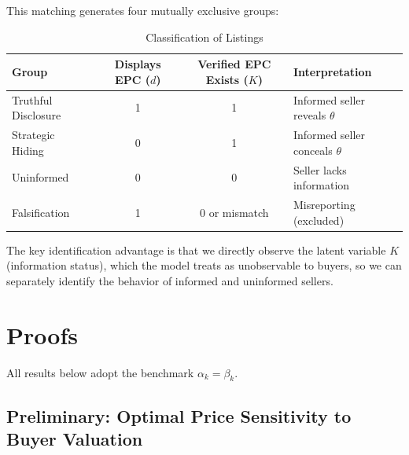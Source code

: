 \documentclass[10pt,letterpaper]{bp-template-concise}
\begin{document}
This matching generates four mutually exclusive groups:

\begin{table}[htbp]
\centering
\caption{Classification of Listings}
\label{tab:listing_types}
\renewcommand{\arraystretch}{1.4}
\begin{tabular}{lccl}
\toprule
\toprule
\textbf{Group} & \textbf{Displays EPC} ($d$) & \textbf{Verified EPC Exists} ($K$) & \textbf{Interpretation} \\
\midrule
Truthful Disclosure & 1 & 1 & Informed seller reveals $\theta$ \\
Strategic Hiding & 0 & 1 & Informed seller conceals $\theta$ \\
Uninformed & 0 & 0 & Seller lacks information \\
Falsification & 1 & 0 or mismatch & Misreporting (excluded) \\
\bottomrule
\bottomrule
\end{tabular}
\end{table}

The key identification advantage is that we directly observe the latent variable $K$ (information status), which the model treats as unobservable to buyers, so we can separately identify the behavior of informed and uninformed sellers.


\section{Proofs}
\label{app:proofs}

All results below adopt the benchmark $\alpha_k=\beta_k$.

\subsection*{Preliminary: Optimal Price Sensitivity to Buyer Valuation}
\end{document}

